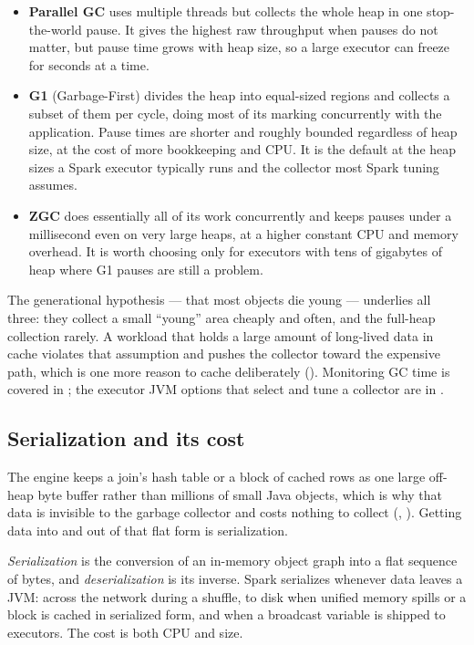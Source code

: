 \begin{itemize}
  \item \textbf{Parallel GC} uses multiple threads but collects the whole heap in
        one stop-the-world pause. It gives the highest raw throughput when pauses
        do not matter, but pause time grows with heap size, so a large executor
        can freeze for seconds at a time.
  \item \textbf{G1} (Garbage-First) divides the heap into equal-sized regions and
        collects a subset of them per cycle, doing most of its marking
        concurrently with the application. Pause times are shorter and roughly
        bounded regardless of heap size, at the cost of more bookkeeping and CPU.
        It is the default at the heap sizes a Spark executor typically runs and
        the collector most Spark tuning assumes.
  \item \textbf{ZGC} does essentially all of its work concurrently and keeps
        pauses under a millisecond even on very large heaps, at a higher constant
        CPU and memory overhead. It is worth choosing only for executors with
        tens of gigabytes of heap where G1 pauses are still a problem.
\end{itemize}

The generational hypothesis --- that most objects die young --- underlies all
three: they collect a small ``young'' area cheaply and often, and the full-heap
collection rarely. A workload that holds a large amount of long-lived data in
cache violates that assumption and pushes the collector toward the expensive
path, which is one more reason to cache deliberately ().
Monitoring GC time is covered in ; the executor JVM options
that select and tune a collector are in .

\subsection{Serialization and its cost}
\label{sec:prereq-serialization}

The engine keeps a join's hash table or a block of cached rows as one large
off-heap byte buffer rather than millions of small Java objects, which is why
that data is invisible to the garbage collector and costs nothing to collect
(, ). Getting data into and
out of that flat form is serialization.

\emph{Serialization} is the conversion of an in-memory object graph into a flat
sequence of bytes, and \emph{deserialization} is its inverse. Spark serializes
whenever data leaves a JVM: across the network during a shuffle, to disk when
unified memory spills or a block is cached in serialized form, and when a
broadcast variable is shipped to executors. The cost is both CPU and size.

